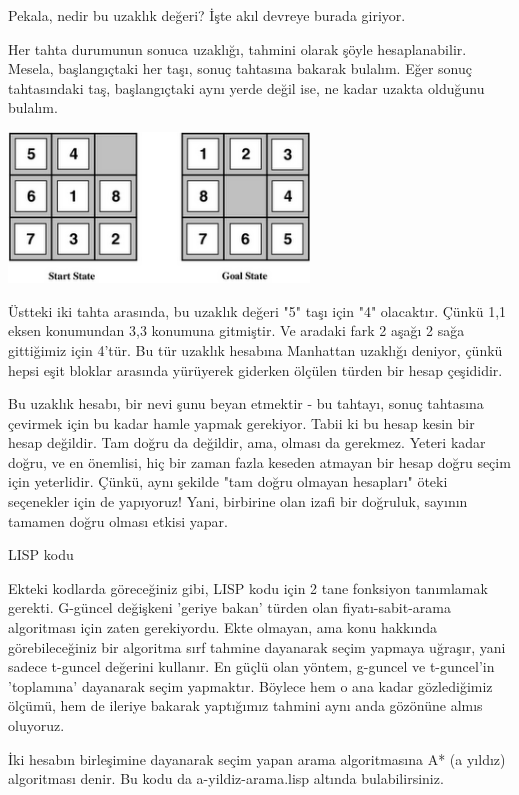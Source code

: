 \documentclass[12pt,fleqn]{article}\usepackage{../../common}
\begin{document}
Pekala, nedir bu uzaklık değeri? İşte akıl devreye burada giriyor.

Her tahta durumunun sonuca uzaklığı, tahmini olarak şöyle
hesaplanabilir. Mesela, başlangıçtaki her taşı, sonuç tahtasına bakarak
bulalım. Eğer sonuç tahtasındaki taş, başlangıçtaki aynı yerde değil ise,
ne kadar uzakta olduğunu bulalım.

\includegraphics[height=4cm]{8-puzzle-start.png}

Üstteki iki tahta arasında, bu uzaklık değeri "5" taşı için "4"
olacaktır. Çünkü 1,1 eksen konumundan 3,3 konumuna gitmiştir. Ve aradaki
fark 2 aşağı 2 sağa gittiğimiz için 4'tür. Bu tür uzaklık hesabına
Manhattan uzaklığı deniyor, çünkü hepsi eşit bloklar arasında yürüyerek
giderken ölçülen türden bir hesap çeşididir.

Bu uzaklık hesabı, bir nevi şunu beyan etmektir - bu tahtayı, sonuç
tahtasına çevirmek için bu kadar hamle yapmak gerekiyor. Tabii ki bu hesap
kesin bir hesap değildir. Tam doğru da değildir, ama, olması da
gerekmez. Yeteri kadar doğru, ve en önemlisi, hiç bir zaman fazla keseden
atmayan bir hesap doğru seçim için yeterlidir. Çünkü, aynı şekilde "tam
doğru olmayan hesapları" öteki seçenekler için de yapıyoruz! Yani,
birbirine olan izafi bir doğruluk, sayının tamamen doğru olması etkisi
yapar.

LISP kodu

Ekteki kodlarda göreceğiniz gibi, LISP kodu için 2 tane fonksiyon tanımlamak
gerekti. G-güncel değişkeni 'geriye bakan' türden olan fiyatı-sabit-arama
algoritması için zaten gerekiyordu. Ekte olmayan, ama konu hakkında
görebileceğiniz bir algoritma sırf tahmine dayanarak seçim yapmaya uğraşır,
yani sadece t-guncel değerini kullanır. En güçlü olan yöntem, g-guncel ve
t-guncel'in 'toplamına' dayanarak seçim yapmaktır. Böylece hem o ana kadar
gözlediğimiz ölçümü, hem de ileriye bakarak yaptığımız tahmini aynı anda
gözönüne almıs oluyoruz.

İki hesabın birleşimine dayanarak seçim yapan arama algoritmasına A* (a
yıldız) algoritması denir. Bu kodu da a-yildiz-arama.lisp altında
bulabilirsiniz.
\end{document}
